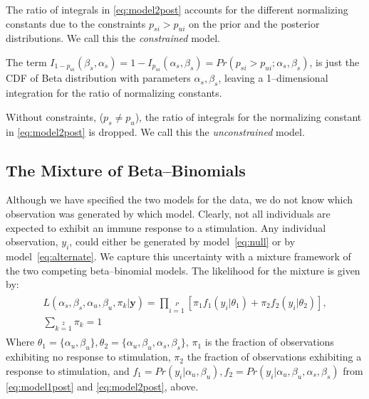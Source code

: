 \documentclass[11pt]{article}
\begin{document}
The ratio of integrals in \eqref{eq:model2post} accounts for the different normalizing constants due to the constraints $p_{si}>p_{ui}$ on the prior and the posterior distributions. We call this the \emph{constrained} model. 

The term $I_{1-p_{ui}}(\beta_s,\alpha_s)=1-I_{p_{ui}}(\alpha_s,\beta_s)=Pr(p_{si} > p_{ui}; \alpha_s,\beta_s)$, is just the CDF of Beta distribution with parameters $\alpha_s,\beta_s$, leaving a 1--dimensional integration for the ratio of normalizing constants.

Without constraints, ($p_s\ne p_u$), the ratio of integrals for the normalizing constant in \eqref{eq:model2post} is dropped. We call this the \emph{unconstrained} model.


\subsection{The Mixture of Beta--Binomials}
Although we have specified the two models for the data, we do not know which observation was generated by which model. Clearly, not all individuals are expected to exhibit an immune response to a stimulation. Any individual observation, $y_i$, could either be generated by model~\eqref{eq:null} or by model~\eqref{eq:alternate}. We capture this uncertainty with a mixture framework of the two competing beta--binomial models. The likelihood for the mixture is given by:
\begin{align}
\begin{split}
L(\alpha_s,\beta_s,\alpha_u,\beta_u,\pi_k|\mathbf{y})=\prod\limits_{i=1}\limits^P\left[ \pi_1 f_1(y_i|\theta_1) +\pi_2 f_2(y_i|\theta_2) \right] ,\\ \sum\limits_{k=1}\limits^2\pi_k=1
\end{split}
\end{align}
Where $\theta_1=\{\alpha_u,\beta_u\}, \theta_2=\{\alpha_u,\beta_u,\alpha_s,\beta_s\}$, $\pi_1$ is the fraction of observations exhibiting no response to stimulation, $\pi_2$ the fraction of observations exhibiting a response to stimulation, and $f_1 = Pr(y_i|\alpha_u,\beta_u), f_2 = Pr(y_i|\alpha_u,\beta_u,\alpha_s,\beta_s)$ from \eqref{eq:model1post} and \eqref{eq:model2post}, above. 
\end{document}
